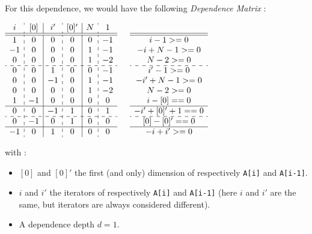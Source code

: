 \documentclass[paper=a4, fontsize=11.5pt]{scrartcl}
\numberwithin{equation}{section}        %
\numberwithin{figure}{section}          %
\numberwithin{table}{section}               %
\begin{document}
        For this dependence, we would have the following \textit{Dependence Matrix} :
\begin{center}
$
        \begin{array}{c:c|c:c|c:c}
        i &    [0] & i' &   [0]' &  N &  1 \\ \hline \hline
        1 &    0 &   0 &    0 &   0 &  -1 \\
        -1 &    0 &   0 &    0 &   1 &  -1 \\
        0 &    0 &   0 &    0 &   1 &  -2 \\ \hdashline
        0 &    0 &   1 &    0 &   0 &  -1 \\
        0 &    0 &  -1 &    0 &   1 &  -1 \\
        0 &    0 &   0 &    0 &   1 &  -2 \\
        1 &   -1 &   0 &    0 &   0 &   0 \\ \hline
        0 &    0 &  -1 &    1 &   0 &   1 \\ \hdashline
        0 &   -1 &   0 &    1 &   0 &   0 \\ \hline
        -1 &    0 &   1 &    0 &   0 &   0 \\
        \end{array}
        \qquad
        \begin{matrix}
                \\ \hline \hline
        {i-1 >= 0} \\
        {-i+N-1 >= 0} \\
        {N-2 >= 0} \\ \hdashline
        {i'-1 >= 0} \\
        {-i'+N-1 >= 0} \\
        {N-2 >= 0}  \\
        {i-[0] == 0}\\ \hline
        {-i'+[0]'+1 == 0} \\ \hdashline
        {[0] - [0]' == 0}  \\ \hline
        {-i+i' >= 0} \\
        \end{matrix}
$
\end{center}
    with :
    \begin{itemize}
        \item $[0]$ and $[0]'$ the first (and only) dimension of respectively \verb'A[i]' and
            \verb'A[i-1]'.
        \item $i$ and $i'$ the iterators of respectively \verb'A[i]' and \verb'A[i-1]'
            (here $i$ and $i'$ are the same, but iterators are always considered different).
        \item A dependence depth $d = 1$.
    \end{itemize}
    
\end{document}
